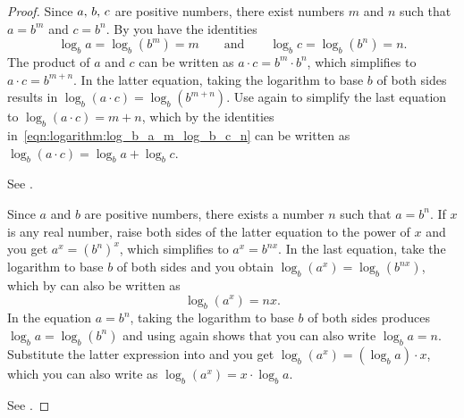 \documentclass[a4paper,oneside,12pt]{article}
\begin{document}
\begin{proof}
Since ${a},\, {b},\, {c}$ are positive numbers, there exist numbers $m$
and $n$ such that $a = b^m$ and $c = b^n$.  By
you have the identities
\begin{equation}
\label{eqn:logarithm:log_b_a_m_log_b_c_n}
\log_b a = \log_b (b^m) = m
\qquad
\text{and}
\qquad
\log_b c = \log_b (b^n) = n.
\end{equation}
The product of $a$ and $c$ can be written as
$a \cdot c = b^m \cdot b^n$, which simplifies to
$a \cdot c = b^{m + n}$.  In the latter equation, taking the logarithm
to base $b$ of both sides results in
$\log_b (a \cdot c) = \log_b (b^{m+n})$.  Use
again to simplify the last equation to $\log_b (a \cdot c) = m+n$,
which by the identities in~\eqref{eqn:logarithm:log_b_a_m_log_b_c_n}
can be written as
$\log_b (a \cdot c) = \log_b a + \log_b c$.

See .

Since $a$ and $b$ are positive numbers, there exists a number $n$ such
that $a = b^n$.  If $x$ is any real number, raise both sides of the
latter equation to the power of $x$ and you get
$a^x = (b^n)^x$, which simplifies to $a^x = b^{nx}$.  In the last
equation, take the logarithm to base $b$ of both sides and you obtain
$\log_b (a^x) = \log_b (b^{nx})$, which by
can also be written as
\begin{equation}
\label{eqn:logarithm:log_b_a_x_nx}
\log_b (a^x)
=
nx.
\end{equation}
In the equation $a = b^n$, taking the logarithm to base $b$ of both
sides produces $\log_b a = \log_b (b^n)$ and using
again shows that you can also write $\log_b a = n$.  Substitute the
latter expression into  and you
get $\log_b (a^x) = (\log_b a) \cdot x$, which you can also write as
$\log_b (a^x) = x \cdot \log_b a$.

See .


\end{proof}
\end{document}
